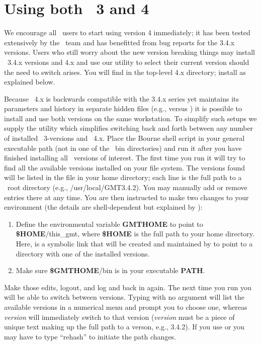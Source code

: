 %
%

\chapter{Using both \gmt\ 3 and 4}
\thispagestyle{headings}

We encourage all \GMT\ users to start using version 4 immediately; it has been tested extensively by
the \GMT\ team and has benefitted from bug reports for the 3.4.x versions.  Users who still worry about the
new version breaking things may install \GMT\ 3.4.x versions and 4.x and use our utility 
to select their current version should the need to switch arises.  You will find 
in the top-level \GMT 4.x directory; install as explained below.

Because \GMT\ 4.x is backwards compatible with the 3.4.x series yet maintains its parameters
and history in separate hidden files (e.g.,  versus )
it is possible to install and use both versions on the same workstation.  To simplify such
setups we supply the utility  which simplifies switching back and forth
between any number of installed \GMT\ 3-versions and \GMT\ 4.x.  Place the  Bourne
shell script in your
general executable path (not in one of the \GMT\ bin directories) and run it after you have
finished installing all \GMT\ versions of interest.  The first time you run 
it will try to find all the available versions installed on your file system.  The versions
found will be listed in the file  in your home directory; each line
is the full path to a \GMT\ root directory (e.g., /usr/local/GMT3.4.2).  You may
manually add or remove entries there at any time.  You are then instructed to make two
changes to your environment (the details are shell-dependent but explained by ):
\begin{enumerate}
\item Define the environmental variable {\bf GMTHOME} to point to {\bf \$HOME}/this\_gmt,
where {\bf \$HOME} is the full path to your home directory.
Here,  is a symbolic link that will be created and maintained by 
to point to a directory with one of the installed versions. 
\item Make sure {\bf \$GMTHOME}/bin is in your executable {\bf PATH}.
\end{enumerate}
Make those edits, logout, and log and back in again.  The next time you run 
you will be able to switch between versions.  Typing  with no argument will list the
available versions in a numerical menu and prompt you to choose one, whereas  {\it version}
will immediately switch to that version ({\it version} must be a piece of unique text making
up the full path to a verson, e.g., 3.4.2).  If you use  or  you may have to type
``rehash'' to initiate the path changes.
